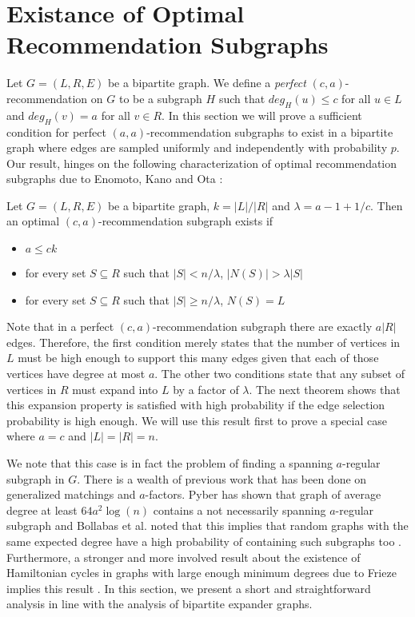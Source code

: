 \section{Existance of Optimal Recommendation Subgraphs}
Let $G=(L,R,E)$ be a bipartite graph. We define a \emph{perfect} $(c,a)$-recommendation on $G$ to be a subgraph $H$ such that $deg_H(u)\leq c$ for all $u\in L$ and $deg_H(v)=a$ for all $v\in R$. In this section we will prove a sufficient condition for perfect $(a,a)$-recommendation subgraphs to exist in a bipartite graph where edges are sampled uniformly and independently with probability $p$. Our result, hinges on the following characterization of optimal recommendation subgraphs due to Enomoto, Kano and Ota \cite{EnomotoKanoOta1988}:

\begin{thm}
Let $G=(L,R,E)$ be a bipartite graph, $k=|L|/|R|$ and $\lambda = a - 1 + 1/c$. Then an optimal $(c,a)$-recommendation subgraph exists if 

\begin{itemize}
\item $a \leq ck$
\item for every set $S\subseteq R$ such that $|S| < n/\lambda$, $|N(S)| > \lambda|S|$
\item for every set $S\subseteq R$ such that $|S| \geq n/\lambda$, $N(S) = L$
\end{itemize}
\end{thm}
 
Note that in a perfect $(c,a)$-recommendation subgraph there are exactly $a|R|$ edges. Therefore, the first condition merely states that the number of vertices in $L$ must be high enough to support this many edges given that each of those vertices have degree at most $a$. The other two conditions state that any subset of vertices in $R$ must expand into $L$ by a factor of $\lambda$. The next theorem shows that this expansion property is satisfied with high probability if the edge selection probability is high enough. We will use this result first to prove a special case where $a=c$ and $|L|=|R|=n$. \vs

We note that this case is in fact the problem of finding a spanning $a$-regular subgraph in $G$. There is a wealth of previous work that has been done on generalized matchings and $a$-factors. Pyber has shown that graph of average degree at least $64a^2\log(n)$ contains a not necessarily spanning $a$-regular subgraph and Bollabas et al. noted that this implies that random graphs with the same expected degree have a high probability of containing such subgraphs too \cite{Bollobas2006, Pyber1985}. Furthermore, a stronger and more involved result about the existence of Hamiltonian cycles in graphs with large enough minimum degrees due to Frieze implies this result \cite{Frieze1988}. In this section, we present a short and straightforward analysis in line with the analysis of bipartite expander graphs.

